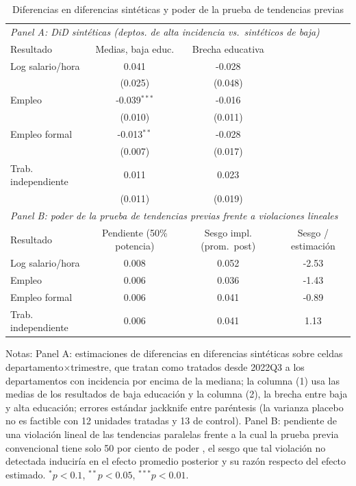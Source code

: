 \begin{table}[!tbp]\centering
\caption{Diferencias en diferencias sintéticas y poder de la prueba de tendencias previas}\label{tab:sdidpower}
\begin{threeparttable}
\footnotesize
\begin{tabular}{lccc}
\toprule
\multicolumn{4}{l}{\emph{Panel A: DiD sintéticas (deptos. de alta incidencia vs.\ sintéticos de baja)}} \\
Resultado & Medias, baja educ. & Brecha educativa & \\
\midrule
Log salario/hora & 0.041 & -0.028 & \\
 & (0.025) & (0.048) & \\
Empleo & -0.039$^{***}$ & -0.016 & \\
 & (0.010) & (0.011) & \\
Empleo formal & -0.013$^{**}$ & -0.028 & \\
 & (0.007) & (0.017) & \\
Trab. independiente & 0.011 & 0.023 & \\
 & (0.011) & (0.019) & \\
\midrule
\multicolumn{4}{l}{\emph{Panel B: poder de la prueba de tendencias previas frente a violaciones lineales \citep{roth_2022_pretest}}} \\
Resultado & Pendiente (50\% potencia) & Sesgo impl. (prom.\ post) & Sesgo / estimación \\ \midrule
Log salario/hora & 0.008 & 0.052 & -2.53 \\
Empleo & 0.006 & 0.036 & -1.43 \\
Empleo formal & 0.006 & 0.041 & -0.89 \\
Trab. independiente & 0.006 & 0.041 & 1.13 \\
\bottomrule
\end{tabular}
\begin{tablenotes}\footnotesize
\item Notas: Panel A: estimaciones de diferencias en diferencias sintéticas \citep{arkhangelsky_2021_sdid} sobre celdas departamento$\times$trimestre, que tratan como tratados desde 2022Q3 a los departamentos con incidencia por encima de la mediana; la columna (1) usa las medias de los resultados de baja educación y la columna (2), la brecha entre baja y alta educación; errores estándar jackknife entre paréntesis (la varianza placebo no es factible con 12 unidades tratadas y 13 de control). Panel B: pendiente de una violación lineal de las tendencias paralelas frente a la cual la prueba previa convencional tiene solo 50 por ciento de poder \citep{roth_2022_pretest}, el sesgo que tal violación no detectada induciría en el efecto promedio posterior y su razón respecto del efecto estimado. $^{*}p<0.1$, $^{**}p<0.05$, $^{***}p<0.01$.
\end{tablenotes}
\end{threeparttable}\end{table}
